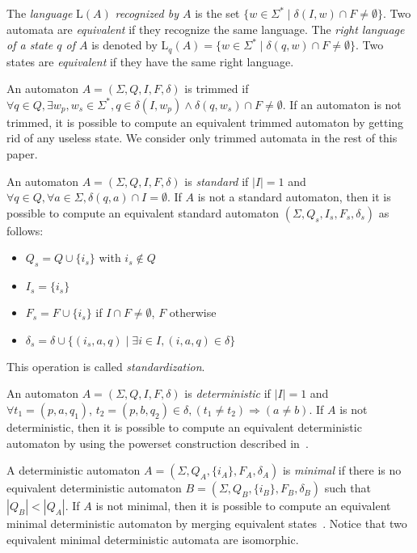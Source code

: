 \documentclass{llncs}
\begin{document}
	The \emph{language} $\mathrm{L}(A)$ \emph{recognized by $A$} is the set $\{w \in \Sigma^* \mid \delta(I, w) \cap F \neq \emptyset\}$.
Two automata are \emph{equivalent} if they recognize the same language.
The \emph{right language of a state $q$ of $A$} is denoted by $\mathrm{L}_{q}(A) = \{w \in \Sigma^* \mid \delta(q, w) \cap F \neq \emptyset\}$.
Two states are \emph{equivalent} if they have the same right language.

	An automaton $A = (\Sigma, Q, I, F, \delta)$ is trimmed if $\forall q \in Q, \exists w_p, w_s \in \Sigma^*, q \in \delta(I, w_p) \wedge \delta(q, w_s) \cap F \neq \emptyset$.
	If an automaton is not trimmed, it is possible to compute an equivalent trimmed automaton by getting rid of any useless state.
	We consider only trimmed automata in the rest of this paper.

	An automaton $A = (\Sigma, Q, I, F, \delta)$ is \emph{standard} if $|I| = 1$ and $\forall q \in Q, \forall a \in \Sigma, \delta(q, a) \cap I = \emptyset$.
If $A$ is not a standard automaton, then it is possible to compute an equivalent standard automaton $(\Sigma, Q_s, I_s, F_s, \delta_s)$ as follows:
\begin{itemize}
	\item $Q_s = Q \cup \{i_s\}$ with $i_s \notin Q$
	\item $I_s = \{i_s\}$
	\item $F_s = F \cup \{i_s\}$ if $I \cap F \neq \emptyset$, $F$ otherwise
	\item $\delta_s = \delta \cup \{(i_s, a, q) \mid \exists i \in I, (i, a, q) \in \delta\}$
\end{itemize}
This operation is called \emph{standardization}.

	An automaton $A = (\Sigma, Q, I, F, \delta)$ is \emph{deterministic} if $|I| = 1$ and $\forall t_1 = (p, a, q_1)$, $t_2 = (p, b, q_2) \in \delta, (t_1 \neq t_2) \Longrightarrow (a \neq b)$.
	If $A$ is not deterministic, then it is possible to compute an equivalent deterministic automaton by using the powerset construction described in~\cite{RS59}.
	
	A deterministic automaton $A = (\Sigma, Q_A, \{i_A\}, F_A, \delta_A)$ is \emph{minimal} if there is no equivalent deterministic automaton $B = (\Sigma, Q_B, \{i_B\}, F_B, \delta_B)$ such that $|Q_B| < |Q_A|$.
	If $A$ is not minimal, then it is possible to compute an equivalent minimal deterministic automaton by merging equivalent states~\cite{Hop71,Moo56}.
	Notice that two equivalent minimal deterministic automata are isomorphic.
\end{document}
